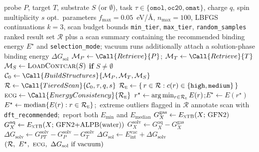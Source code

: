 \begin{algorithm}[t]
\caption{\textsc{Rapids} --- MCP \texttt{scan\_orientations} driver}
\label{alg:rapids}
\begin{algorithmic}[1]
\Require probe $P$, target $T$, substrate $S$ (or $\emptyset$), task
         $\tau \in \{\texttt{omol}, \texttt{oc20}, \texttt{omat}\}$,
         charge $q$, spin multiplicity $s$
\Require opt.\ parameters $f_{\max}{=}0.05$~eV/\AA, $n_{\max}{=}100$,
         LBFGS continuations $k{=}3$, scan budget bounds
         \texttt{min\_tier}, \texttt{max\_tier}, \texttt{random\_samples}
\Ensure  ranked result set $\mathcal{R}$ plus a scan summary containing
         the recommended binding energy $E^{\star}$ and
         \texttt{selection\_mode}; vacuum runs additionally attach a
         solution-phase binding energy $\Delta G_{\mathrm{sol}}$
\Statex
\State $\mathcal{M}_P \gets \Call{Retrieve}{P}$;\quad
       $\mathcal{M}_T \gets \Call{Retrieve}{T}$
\State $\mathcal{M}_S \gets \textsc{LoadContcar}(S)$ \textbf{if} $S{\neq}\emptyset$
\State $\mathcal{C}_0 \gets \Call{BuildStructures}{\mathcal{M}_P,\mathcal{M}_T,\mathcal{M}_S}$
\Statex
\State $\mathcal{R} \gets \Call{TieredScan}{\mathcal{C}_0,\tau,q,s}$
\Statex
\State $\mathcal{R}_{\textsc{e}} \gets \{\, r \in \mathcal{R} : c(r) \in \{\texttt{high},\texttt{medium}\}\,\}$
\State $\textsc{ecg} \gets \Call{EnergyConsistency}{\mathcal{R}_{\textsc{e}}}$
 
    \State $r^{\star} \gets \arg\min_{r \in \mathcal{R}_{\textsc{e}}} E(r)$;\quad $E^{\star} \gets E(r^{\star})$
 
    \State $E^{\star} \gets \mathrm{median}\{E(r) : r \in \mathcal{R}_{\textsc{e}}\}$;\
           extreme outliers flagged in $\mathcal{R}$
\Else {}
    \State annotate scan with \texttt{dft\_recommended};\
           report both $E_{\min}$ and $E_{\mathrm{median}}$
\EndIf
\Statex
{} 
        \State $G^{\mathrm{gas}}_{X} \gets E_{\textsc{xTB}}(X;\,\text{GFN2})$
        \State $G^{\mathrm{aq}}_{X}  \gets E_{\textsc{xTB}}(X;\,\text{GFN2+ALPB(water)})$
        \State $G^{\mathrm{solv}}_{X} \gets G^{\mathrm{aq}}_{X} - G^{\mathrm{gas}}_{X}$
    \EndFor
    \State $\Delta G_{\mathrm{solv}} \gets G^{\mathrm{solv}}_{PT}-G^{\mathrm{solv}}_{P}-G^{\mathrm{solv}}_{T}$
    \State $\Delta G_{\mathrm{sol}} \gets E_{\mathrm{int}}^{\mathrm{vac}} + \Delta G_{\mathrm{solv}}$
\EndIf
\Statex
\State \Return $(\mathcal{R},\ E^{\star},\ \textsc{ecg},\ \Delta G_{\mathrm{sol}}\ \text{if vacuum})$
\end{algorithmic}
\end{algorithm}

